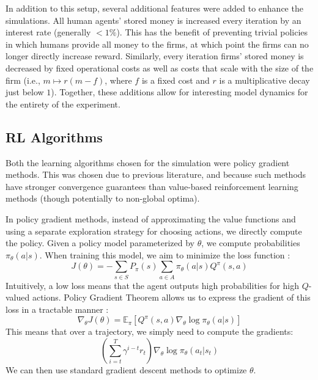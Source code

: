 \documentclass[twoside,twocolumn]{article}
\begin{document}
\medskip

In addition to this setup, several additional features were added to enhance the simulations. All human agents' stored money is increased every iteration by an interest rate (generally $<1\%$). This has the benefit of preventing trivial policies in which humans provide all money to the firms, at which point the firms can no longer directly increase reward. Similarly, every iteration firms' stored money is decreased by fixed operational costs as well as costs that scale with the size of the firm (i.e., $m \mapsto r(m - f)$, where $f$ is a fixed cost and $r$ is a multiplicative decay just below $1$). Together, these additions allow for interesting model dynamics for the entirety of the experiment.


\subsection{RL Algorithms}
Both the learning algorithms chosen for the simulation were policy gradient methods. This was chosen due to previous literature, and because such methods have stronger convergence guarantees than value-based reinforcement learning methods (though potentially to non-global optima).

\medskip


In policy gradient methods, instead of approximating the value functions and using a separate exploration strategy for choosing actions, we directly compute the policy. Given a policy model parameterized by $\theta$, we compute probabilities $\pi_{\theta}(a|s)$. When training this model, we aim to minimize the loss function \cite{actor-critic}:
\[
J(\theta) = -\sum_{s \in S} P_{\pi}(s) \sum_{a\in A} \pi_{\theta}(a|s) Q^{\pi}(s, a)
\]
Intuitively, a low loss means that the agent outputs high probabilities for high $Q$-valued actions. Policy Gradient Theorem allows us to express the gradient of this loss in a tractable manner \cite{reinforce-lectures} \cite{actor-critic}:
\[
\nabla_{\theta} J(\theta) = \mathbb{E}_{\pi}[Q^{\pi}(s, a) \nabla_{\theta} \log \pi_{\theta}(a|s)]
\]
This means that over a trajectory, we simply need to compute the gradients:
\[
\left(\sum_{i=t}^T \gamma^{i-t} r_t\right) \nabla_{\theta} \log \pi_{\theta}(a_t|s_t)
\]
We can then use standard gradient descent methods to optimize $\theta$.

\medskip
\end{document}
